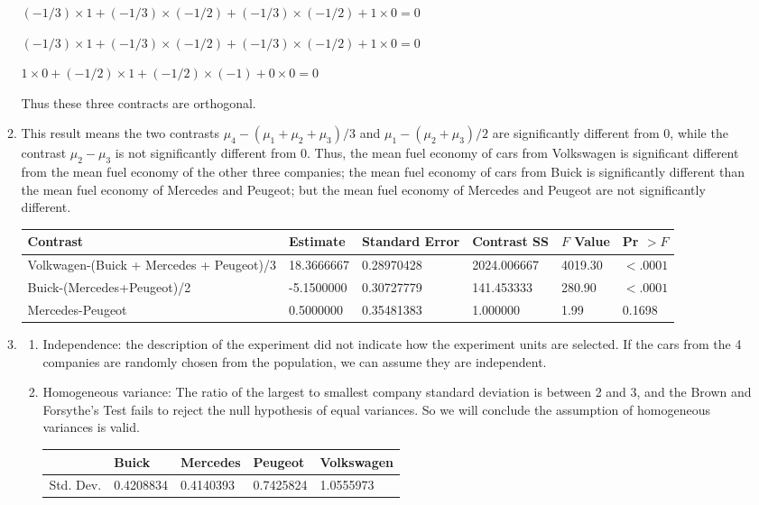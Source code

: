 \documentclass{article}
\begin{document}
\begin{enumerate}[leftmargin = 0 em, label = \arabic*., font = \bfseries]
\begin{enumerate}
	$(-1/3) \times 1 + (-1/3)\times (-1/2) + (-1/3)\times (-1/2) + 1 \times 0= 0$

	$(-1/3)\times 1 + (-1/3) \times (-1/2) + (-1/3)\times (-1/2) + 1 \times 0= 0$

	$1 \times 0 + (-1/2)\times 1 + (-1/2)\times (-1) + 0 \times 0 = 0$

	Thus these three contracts are orthogonal.


	\item This result means the two contrasts $\mu_4 - (\mu_1 + \mu_2 + \mu_3)/3$ and $\mu_1 - (\mu_2 + \mu_3)/2$ are significantly different from 0, while the contrast $\mu_2 - \mu_3$ is not significantly different from 0. Thus, the mean fuel economy of cars from Volkswagen is significant different from the mean fuel economy of the other three companies; the mean fuel economy of cars from Buick is significantly different than the mean fuel economy of Mercedes and Peugeot; but the mean fuel economy of Mercedes and Peugeot are not significantly different.

\hspace{-5em}
	\begin{tabular}{llllll}
	\toprule
	Contrast & Estimate&Standard Error& Contrast SS	& $F$ Value & Pr $>F$\\
	\midrule
Volkwagen-(Buick + Mercedes + Peugeot)/3&18.3666667&0.28970428&2024.006667&4019.30&$<.0001$\\
Buick-(Mercedes+Peugeot)/2&-5.1500000&0.30727779&141.453333&280.90&$<.0001$\\
Mercedes-Peugeot&0.5000000&0.35481383&1.000000&1.99&0.1698\\
\bottomrule
	\end{tabular}

	
	\item 
	\begin{enumerate}
		\item Independence: the description of the experiment did not indicate how the experiment units are selected. If the cars from the 4 companies are randomly chosen from the population, we can assume they are independent.

		\item Homogeneous variance: The ratio of the largest to smallest company standard deviation is between 2 and 3, and the  Brown and Forsythe's Test fails to reject the null hypothesis of equal variances. So we will conclude the assumption of homogeneous variances is valid.

		\begin{center}
		\begin{tabular}{lllll}
		\toprule
		 & Buick & Mercedes & Peugeot & Volkswagen\\
		 \midrule
		 Std. Dev. & 0.4208834 & 0.4140393 & 0.7425824 & 1.0555973\\
		 \bottomrule
		\end{tabular}


\end{center}
\end{enumerate}
\end{enumerate}
\end{enumerate}
\end{document}

